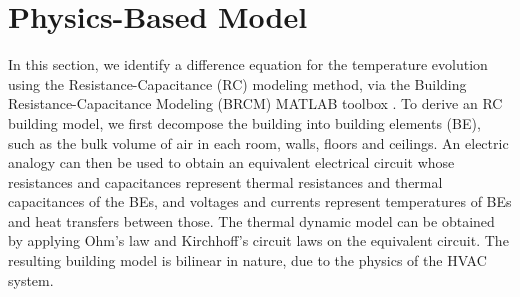 
\section{Physics-Based Model} \label{sec:Physics_Based_Model}

In this section, we identify a difference equation for the temperature evolution using the Resistance-Capacitance (RC)  modeling method, via the Building Resistance-Capacitance Modeling (BRCM) MATLAB toolbox \cite{David}. 
To derive an RC building model, we first decompose the building into building elements (BE), such as the bulk volume of air in each room, walls, floors and ceilings. 
An electric analogy can then be used to obtain an equivalent electrical circuit whose resistances and capacitances represent thermal resistances and thermal capacitances of the BEs, and voltages and currents represent temperatures of BEs and heat transfers between those. 
The thermal dynamic model can be obtained by applying Ohm's law and Kirchhoff's circuit laws on the equivalent circuit.
The resulting building model is bilinear in nature, due to the physics of the HVAC system.




